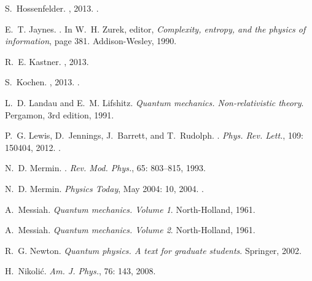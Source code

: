 \documentclass[12pt]{article}
\begin{document}
\begin{thebibliography}{63}
S.~Hossenfelder.
, 2013.
.

E.~T. Jaynes.
.
\newblock In W.~H. Zurek, editor, \emph{Complexity, entropy, and the physics of
  information}, page 381. Addison-Wesley, 1990.

R.~E. Kastner.
, 2013.

S.~Kochen.
, 2013.
.

L.~D. Landau and E.~M. Lifshitz.
\newblock \emph{{Quantum mechanics. Non-relativistic theory}}.
\newblock Pergamon, 3rd edition, 1991.

P.~G. Lewis, D.~Jennings, J.~Barrett, and T.~Rudolph.
.
\newblock \emph{Phys. Rev. Lett.}, 109: 150404, 2012.
.

N.~D. Mermin.
.
\newblock \emph{Rev. Mod. Phys.}, 65: 803--815, 1993.

N.~D. Mermin.
\newblock \emph{Physics Today}, May 2004: 10, 2004.
.

A.~Messiah.
\newblock \emph{{Quantum mechanics. Volume 1}}.
\newblock North-Holland, 1961{}.

A.~Messiah.
\newblock \emph{{Quantum mechanics. Volume 2}}.
\newblock North-Holland, 1961{}.

R.~G. Newton.
\newblock \emph{{Quantum physics. A text for graduate students}}.
\newblock Springer, 2002.

H.~Nikoli\'c.
\newblock \emph{Am. J. Phys.}, 76: 143, 2008.


\end{thebibliography}
\end{document}
